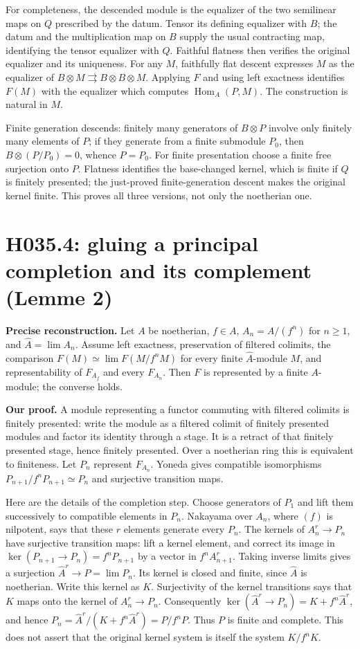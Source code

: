 For completeness, the descended module is the equalizer of the two
semilinear maps on $Q$ prescribed by the datum. Tensor its defining
equalizer with $B$; the datum and the multiplication map on $B$ supply
the usual contracting map, identifying the tensor equalizer with $Q$.
Faithful flatness then verifies the original equalizer and its uniqueness.
For any $M$, faithfully flat descent expresses $M$ as the equalizer of
$B\otimes M\rightrightarrows B\otimes B\otimes M$. Applying $F$ and
using left exactness identifies $F(M)$ with the equalizer which computes
$\operatorname{Hom}_A(P,M)$. The construction is natural in $M$.

Finite generation descends: finitely many generators of $B\otimes P$
involve only finitely many elements of $P$; if they generate from a finite
submodule $P_0$, then $B\otimes(P/P_0)=0$, whence $P=P_0$. For finite
presentation choose a finite free surjection onto $P$. Flatness identifies
the base-changed kernel, which is finite if $Q$ is finitely presented;
the just-proved finite-generation descent makes the original kernel
finite. This proves all three versions, not only the noetherian one.

\section{H035.4: gluing a principal completion and its complement (Lemme 2)}
\textbf{Precise reconstruction.} Let $A$ be noetherian, $f\in A$,
$A_n=A/(f^n)$ for $n\geq1$, and $\widehat A=\lim A_n$. Assume left
exactness, preservation of filtered colimits, the comparison
$F(M)\simeq\lim F(M/f^nM)$ for every finite $\widehat A$-module $M$,
and representability of $F_{A_f}$ and every $F_{A_n}$. Then $F$ is
represented by a finite $A$-module; the converse holds.

\textbf{Our proof.} A module representing a functor commuting with
filtered colimits is finitely presented: write the module as a filtered
colimit of finitely presented modules and factor its identity through a
stage. It is a retract of that finitely presented stage, hence finitely
presented. Over a noetherian ring this is equivalent to finiteness.
Let $P_n$ represent $F_{A_n}$. Yoneda gives compatible isomorphisms
$P_{n+1}/f^nP_{n+1}\simeq P_n$ and surjective transition maps.

Here are the details of the completion step. Choose generators of $P_1$
and lift them successively to compatible elements in $P_n$. Nakayama over
$A_n$, where $(f)$ is nilpotent, says that these $r$ elements generate
every $P_n$. The kernels of $A_n^r\to P_n$ have surjective transition
maps: lift a kernel element, and correct its image in
$\ker(P_{n+1}\to P_n)=f^nP_{n+1}$ by a vector in $f^nA_{n+1}^r$.
Taking inverse limits gives a surjection $\widehat A^r\to P=\lim P_n$.
Its kernel is closed and finite, since $\widehat A$ is noetherian.
Write this kernel as $K$. Surjectivity of the kernel transitions says
that $K$ maps onto the kernel of $A_n^r\to P_n$. Consequently
$\ker(\widehat A^r\to P_n)=K+f^n\widehat A^r$, and hence
$P_n=\widehat A^r/(K+f^n\widehat A^r)=P/f^nP$.
Thus $P$ is finite and complete. This does not assert that the original
kernel system is itself the system $K/f^nK$.

